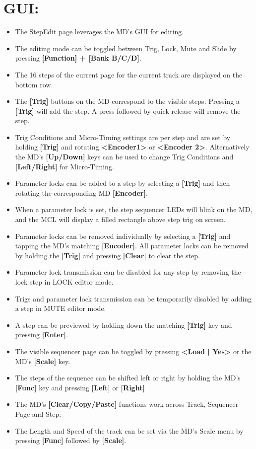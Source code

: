 \section{GUI:}
\begin{itemize}
\item The StepEdit page leverages the MD's GUI for editing.
\item The editing mode can be toggled between Trig, Lock, Mute and Slide by pressing \textbf{[Function] + [Bank B/C/D]}.
\item The 16 steps of the current page for the current track are displayed on the bottom row.
\item The \textbf{[Trig]} buttons on the MD correspond to the visible steps. Pressing a \textbf{[Trig]} will add the step. A press followed by quick release will remove the step. 
\item Trig Conditions and Micro-Timing settings are per step and are set by holding \textbf{[Trig]} and rotating \textbf{<Encoder1>} or \textbf{<Encoder 2>}. Alternatively the MD's \textbf{[Up/Down]} keys can be used to change Trig Conditions and \textbf{[Left/Right]} for Micro-Timing.
\item Parameter locks can be added to a step by selecting a \textbf{[Trig]} and then rotating the corresponding MD \textbf{[Encoder]}.
\item When a parameter lock is set, the step sequencer LEDs will blink on the MD, and the MCL will display a filled rectangle above step trig on screen.
\item Parameter locks can be removed individually by selecting a \textbf{[Trig]} and tapping the MD's matching \textbf{[Encoder]}. All parameter locks can be removed by holding the \textbf{[Trig]} and pressing \textbf{[Clear]} to clear the step.
\item Parameter lock transmission can be disabled for any step by removing the lock step in LOCK editor mode.
\item Trigs and parameter lock transmission can be temporarily disabled by adding a step in MUTE editor mode.
\item A step can be previewed by holding down the matching \textbf{[Trig]} key and pressing \textbf{[Enter]}.
\item The visible sequencer page can be toggled by pressing \textbf{<Load | Yes>} or the MD's \textbf{[Scale]} key.
\item The steps of the sequence can be shifted left or right by holding the MD's \textbf{[Func]} key and pressing \textbf{[Left]} or \textbf{[Right]}
\item The MD's \textbf{[Clear/Copy/Paste]} functions work across Track, Sequencer Page and Step.
\item The Length and Speed of the track can be set via the MD's Scale menu by pressing
\textbf{[Func]} followed by \textbf{[Scale]}.

\end{itemize}
\newpage
